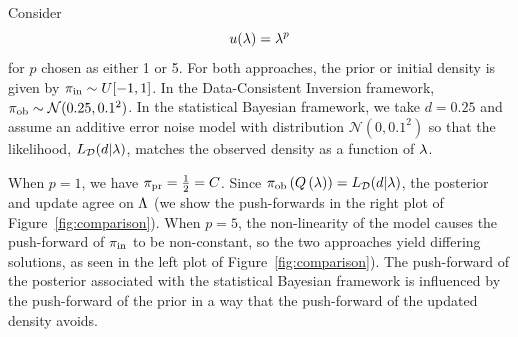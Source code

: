 \begin{ex}
Consider
\begin{equation}
u(\lambda) = \lambda^p
\end{equation}
for $p$ chosen as either 1 or 5. 
For both approaches, the prior or initial density is given by $\operatorname*{\pi_{in}} \sim U[-1,1]$. 
In the Data-Consistent Inversion framework, $\operatorname*{\pi_{ob}} \sim \mathcal{N}(0.25,0.1^2)$.
In the statistical Bayesian framework, we take $d=0.25$ and assume an additive error noise model with distribution $\mathcal{N}(0,0.1^2)$ so that the likelihood, $L_{\mathcal{D}}(d | \lambda)$, matches the observed density as a function of $\lambda$.

When $p=1$, we have $\operatorname*{\pi_{pr}} = \frac{1}{2} = C$.
Since $\operatorname*{\pi_{ob}}\left ( Q\left ( \lambda \right ) \right ) = L_{\mathcal{D}}(d|\lambda)$, the posterior and update agree on ${\Lambda}$ (we show the push-forwards in the right plot of Figure~\ref{fig:comparison}). 
When $p=5$, the non-linearity of the model causes the push-forward of $\operatorname*{\pi_{in}}$ to be non-constant, so the two approaches yield differing solutions, as seen in the left plot of Figure~\ref{fig:comparison}).
The push-forward of the posterior associated with the statistical Bayesian framework is influenced by the push-forward of the prior in a way that the push-forward of the updated density avoids.


\end{ex}
